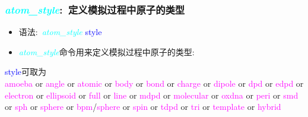 \frame
{
	\frametitle{\textcolor{cyan}{\textit{atom\_style}}:~定义模拟过程中原子的类型}
	\begin{itemize}
		\item 语法:~\textcolor{cyan}{\textit{atom\_style}} \textrm{\textcolor{blue}{style}}
		\item \textcolor{cyan}{\textit{atom\_style}}命令用来定义模拟过程中原子的类型:~\\
			{\fontsize{7.5pt}{5.2pt}\selectfont{\textcolor{red}{不同的对象粒子所具有的属性不同，对于某个粒子对象，粒子不存在的属性就不需要设置，以便节省内存，加速运算}}}
	\end{itemize}
			\textrm{\textcolor{blue}{style}}可取为\\
			\textrm{\textcolor{magenta}{amoeba} or \textcolor{magenta}{angle} or \textcolor{magenta}{atomic} or \textcolor{magenta}{body} or \textcolor{magenta}{bond} or \textcolor{magenta}{charge} or \textcolor{magenta}{dipole} or \textcolor{magenta}{dpd} or \textcolor{magenta}{edpd} or \textcolor{magenta}{electron} or \textcolor{magenta}{ellipsoid} or \textcolor{magenta}{full} or \textcolor{magenta}{line} or \textcolor{magenta}{mdpd} or \textcolor{magenta}{molecular} or \textcolor{magenta}{oxdna} or \textcolor{magenta}{peri} or \textcolor{magenta}{smd} or \textcolor{magenta}{sph} or \textcolor{magenta}{sphere} or \textcolor{magenta}{bpm}/\textcolor{magenta}{sphere} or \textcolor{magenta}{spin} or \textcolor{magenta}{tdpd} or \textcolor{magenta}{tri} or \textcolor{magenta}{template} or \textcolor{magenta}{hybrid}}
\vskip 3pt
{\fontsize{6.2pt}{5.2pt}}
}

